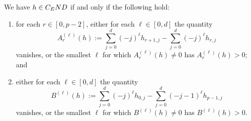 \documentclass[10pt,a4paper]{amsart}
\begin{document}
\begin{thm}\label{t:endh}
We have $h \in C_\textnormal{END}$ if and only if the following hold:
\begin{enumerate}[1.]
\item 
for each $r \in [0, p-2]$, either for each $\ell \in [0, d]$ the quantity
$$
A^{(\ell)}_r(h) := \sum_{j=0}^d (-j)^\ell h_{r+1,j} - \sum_{j=0}^d (-j)^\ell h_{r,j}
$$
vanishes, or the smallest $\ell$ for which $A^{(\ell)}_r(h) \ne 0$ has $A^{(\ell)}_r(h) > 0$; and
\item 
either for each  $\ell \in [0,d]$ the quantity
$$
B^{(\ell)}(h) := \sum_{j=0}^d (-j)^\ell h_{0,j}
- \sum_{j=0}^d (-j-1)^\ell h_{p-1,j}
$$
vanishes, or the smallest $\ell$ for which $B^{(\ell)}(h) \ne 0$ has $B^{(\ell)}(h) > 0$.  
\end{enumerate}
\end{thm}
\end{document}
